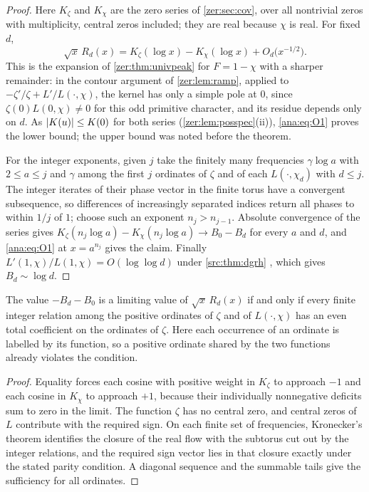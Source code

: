\begin{proof}
Here $K_\zeta$ and $K_\chi$ are the zero series of \cref{zer:sec:cov}, over all nontrivial zeros
with multiplicity, central zeros included; they are real because $\chi$ is real. For fixed $d$,
\begin{equation}\label{ana:eq:O1}
 \sqrt x\,R_d(x)=K_\zeta(\log x)-K_\chi(\log x)+O_d\bigl(x^{-1/2}\bigr).
\end{equation}
This is the expansion of \cref{zer:thm:univpeak} for $F=1-\chi$ with a sharper remainder: in the
contour argument of \cref{zer:lem:ramp}, applied to $-\zeta'/\zeta+L'/L(\cdot,\chi)$, the kernel has
only a simple pole at $0$, since $\zeta(0)L(0,\chi)\ne0$ for this odd primitive character, and its
residue depends only on $d$. As $\lvert K(u)\rvert\le K(0)$ for both series (\cref{zer:lem:posspec}(ii)),
\eqref{ana:eq:O1} proves the lower bound; the upper bound was noted before the theorem.

For the integer exponents, given $j$ take the finitely many frequencies $\gamma\log a$ with
$2\le a\le j$ and $\gamma$ among the first $j$ ordinates of $\zeta$ and of each $L(\cdot,\chi_d)$ with
$d\le j$. The integer iterates of their phase vector in the finite torus have a convergent
subsequence, so differences of increasingly separated indices return all phases to within $1/j$
of $1$; choose such an exponent $n_j>n_{j-1}$. Absolute convergence of the series gives
$K_\zeta(n_j\log a)-K_\chi(n_j\log a)\to B_0-B_d$ for every $a$ and $d$, and \eqref{ana:eq:O1} at
$x=a^{n_j}$ gives the claim. Finally $L'(1,\chi)/L(1,\chi)=O(\log\log d)$ under \cref{src:thm:dgrh}
\cite[Corollary~3.3.2]{IharaMurtyShimura2009Logarithmic}, which gives $B_d\sim\log d$.
\end{proof}

\begin{proposition}\label{ana:prop:parity}
The value $-B_d-B_0$ is a limiting value of $\sqrt x\,R_d(x)$ if and only if every finite
integer relation among the positive ordinates of $\zeta$ and of $L(\cdot,\chi)$ has an even
total coefficient on the ordinates of $\zeta$. Here each occurrence of an ordinate is
labelled by its function, so a positive ordinate shared by the two functions already violates
the condition.
\end{proposition}

\begin{proof}
Equality forces each cosine with positive weight in $K_\zeta$ to approach $-1$ and each
cosine in $K_\chi$ to approach $+1$, because their individually nonnegative
deficits sum to zero in the limit. The function $\zeta$ has no central zero, and central
zeros of $L$ contribute with the required sign. On each finite set of frequencies,
Kronecker's theorem identifies the closure of the real flow with the subtorus cut out by the
integer relations, and the required sign vector lies in that closure exactly under the
stated parity condition. A diagonal sequence and the summable tails give the sufficiency for
all ordinates.
\end{proof}

